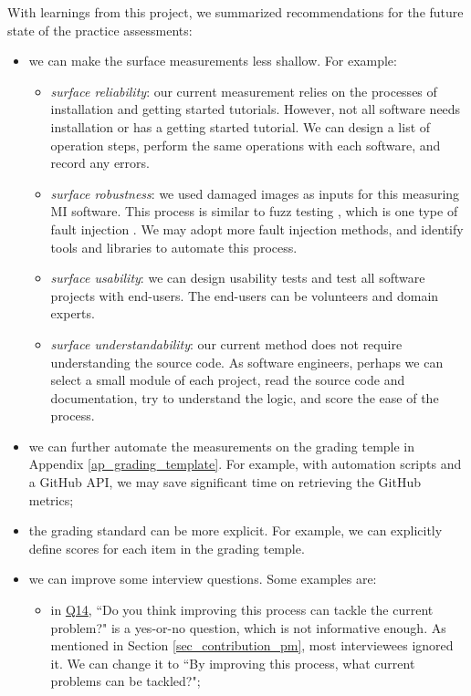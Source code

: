 With learnings from this project, we summarized recommendations for the future state of the practice assessments:
\begin{itemize}
    \item we can make the surface measurements less shallow. For example:
    \begin{itemize}
        \item \textit{surface reliability}: our current measurement relies on the processes of installation and getting started tutorials. However, not all software needs installation or has a getting started tutorial. We can design a list of operation steps, perform the same operations with each software, and record any errors.
        \item \textit{surface robustness}: we used damaged images as inputs for this measuring MI software. This process is similar to fuzz testing \cite{enwiki:1039424308}, which is one type of fault injection \cite{enwiki:1039005082}. We may adopt more fault injection methods, and identify tools and libraries to automate this process.
        \item \textit{surface usability}: we can design usability tests and test all software projects with end-users. The end-users can be volunteers and domain experts.
        \item \textit{surface understandability}: our current method does not require understanding the source code. As software engineers, perhaps we can select a small module of each project, read the source code and documentation, try to understand the logic, and score the ease of the process.
    \end{itemize}
	\item we can further automate the measurements on the grading temple in Appendix \ref{ap_grading_template}. For example, with automation scripts and a GitHub API, we may save significant time on retrieving the GitHub metrics;
	\item the grading standard can be more explicit. For example, we can explicitly define scores for each item in the grading temple.
	\item we can improve some interview questions. Some examples are:
	\begin{itemize}
	    \item in \hyperlink{q14}{Q14}, ``Do you think improving this process can tackle the current problem?" is a yes-or-no question, which is not informative enough. As mentioned in Section \ref{sec_contribution_pm}, most interviewees ignored it. We can change it to ``By improving this process, what current problems can be tackled?";

\end{itemize}
\end{itemize}
